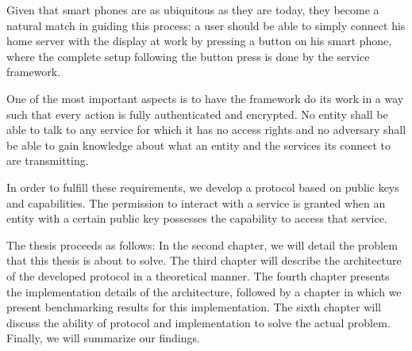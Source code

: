 Given that smart phones are as ubiquitous as they are today, they become a natural match in guiding this process:
a user should be able to simply connect his home server with the display at work by pressing a button on his smart phone, where the complete setup following the button press is done by the service framework.

One of the most important aspects is to have the framework do its work in a way such that every action is fully authenticated and encrypted.
No entity shall be able to talk to any service for which it has no access rights and no adversary shall be able to gain knowledge about what an entity and the services its connect to are transmitting.

In order to fulfill these requirements, we develop a protocol based on public keys and capabilities.
The permission to interact with a service is granted when an entity with a certain public key possesses the capability to access that service.

\bigskip

The thesis proceeds as follows:
In the second chapter, we will detail the problem that this thesis is about to solve.
The third chapter will describe the architecture of the developed protocol in a theoretical manner.
The fourth chapter presents the implementation details of the architecture, followed by a chapter in which we present benchmarking results for this implementation.
The sixth chapter will discuss the ability of protocol and implementation to solve the actual problem.
Finally, we will summarize our findings.

